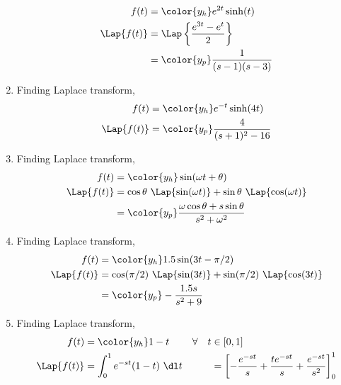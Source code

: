 \begin{enumerate}
\begin{align}
                  f(t)         & = \color{y_h} e^{2t}\sinh(t)                    \\
                  \Lap\{f(t)\} & = \Lap\left\{ \frac{e^{3t} - e^{t}}{2} \right\} \\
                               & = \color{y_p}  \frac{1}{(s-1)(s-3)}
            \end{align}
      \item Finding Laplace transform,
            \begin{align}
                  f(t)         & = \color{y_h} e^{-t}\sinh(4t)         \\
                  \Lap\{f(t)\} & = \color{y_p}  \frac{4}{(s+1)^2 - 16}
            \end{align}
      \item Finding Laplace transform,
            \begin{align}
                  f(t)         & = \color{y_h} \sin(\omega t + \theta)   \\
                  \Lap\{f(t)\} & =  \cos\theta\ \Lap \{\sin(\omega t)\}
                  + \sin\theta\ \Lap \{\cos(\omega t)\}                  \\
                               & = \color{y_p}  \frac{\omega \cos \theta
                        + s \sin \theta}{s^2 + \omega^2}
            \end{align}
      \item Finding Laplace transform,
            \begin{align}
                  f(t)         & = \color{y_h} 1.5\sin(3 t - \pi/2)   \\
                  \Lap\{f(t)\} & =  \cos(\pi/2)\ \Lap \{\sin(3 t)\}
                  + \sin(\pi/2)\ \Lap \{\cos(3 t)\}                   \\
                               & = \color{y_p}  -\frac{1.5s}{s^2 + 9}
            \end{align}
      \item Finding Laplace transform,
            \begin{align}
                  f(t)             & = \color{y_h} 1-t                            &
                  \forall \quad  t & \in [0,1]                                      \\
                  \Lap\{f(t)\}     & =  \int_{0}^{1} e^{-st}(1-t)\ \dl t          &
                                   & = \left[ -\frac{e^{-st}}{s} +
                  \frac{te^{-st}}{s} + \frac{e^{-st}}{s^2} \right]_0^1              \\

\end{align}
\end{enumerate}
